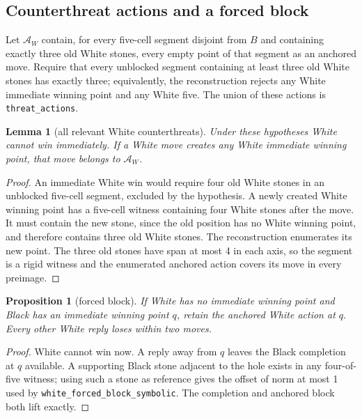\documentclass[11pt]{article}
\newtheorem{lemma}[theorem]{Lemma}
\newtheorem{proposition}[theorem]{Proposition}
\theoremstyle{definition}
\theoremstyle{remark}
\begin{document}
\subsection{Counterthreat actions and a forced block}

Let \(\mathcal A_W\) contain, for every five-cell segment disjoint from \(B\) and containing exactly three old White stones, every empty point of that segment as an anchored move. Require that every unblocked segment containing at least three old White stones has exactly three; equivalently, the reconstruction rejects any White immediate winning point and any White five. The union of these actions is \texttt{threat\_actions}.

\begin{lemma}[all relevant White counterthreats]\label{mac:counter-actions}
Under these hypotheses White cannot win immediately. If a White move creates any White immediate winning point, that move belongs to \(\mathcal A_W\).

\end{lemma}
\begin{proof}
An immediate White win would require four old White stones in an unblocked five-cell segment, excluded by the hypothesis. A newly created White winning point has a five-cell witness containing four White stones after the move. It must contain the new stone, since the old position has no White winning point, and therefore contains three old White stones. The reconstruction enumerates its new point. The three old stones have span at most 4 in each axis, so the segment is a rigid witness and the enumerated anchored action covers its move in every preimage. 
\end{proof}

\begin{proposition}[forced block]\label{mac:forced-block}
If White has no immediate winning point and Black has an immediate winning point \(q\), retain the anchored White action at \(q\). Every other White reply loses within two moves.

\end{proposition}
\begin{proof}
White cannot win now. A reply away from \(q\) leaves the Black completion at \(q\) available. A supporting Black stone adjacent to the hole exists in any four-of-five witness; using such a stone as reference gives the offset of norm at most 1 used by \texttt{white\_forced\_block\_symbolic}. The completion and anchored block both lift exactly. 
\end{proof}
\end{document}
